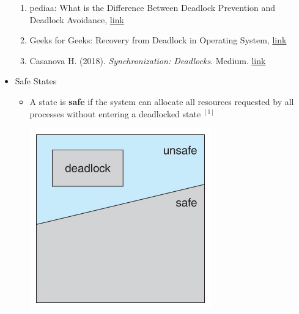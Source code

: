 \documentclass[12pt]{article}
\begin{document}
\begin{itemize}
    \begin{enumerate}[1)]
        \item pediaa: What is the Difference Between Deadlock Prevention and Deadlock Avoidance, \href{https://pediaa.com/what-is-the-difference-between-deadlock-prevention-and-deadlock-avoidance/}{link}
        \item Geeks for Geeks: Recovery from Deadlock in Operating System, \href{https://www.geeksforgeeks.org/recovery-from-deadlock-in-operating-system/?ref=rp}{link}
        \item Casanova H. (2018). \textit{Synchronization: Deadlocks}. Medium. \href{http://www2.hawaii.edu/~esb/2018fall.ics332/oct08.pdf}{link}
    \end{enumerate}
    \item Safe States

    \begin{itemize}
        \item A state is \textbf{safe} if the system can allocate all resources
        requested by all processes without entering a deadlocked state $^{[1]}$

        \begin{center}
            \includegraphics[width=0.6\linewidth]{../images/week_10_notes_1_3.jpg}
        \end{center}


\end{itemize}
\end{itemize}
\end{document}
